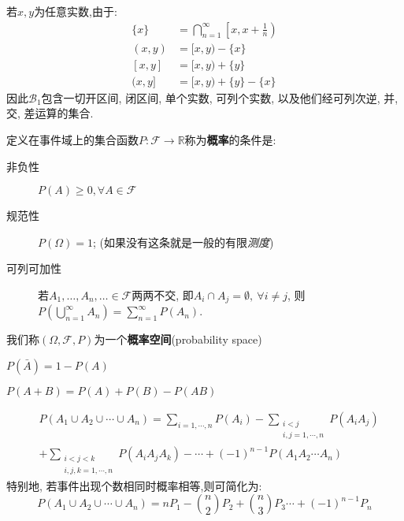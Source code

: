 若$x,y$为任意实数,由于:
\begin{align*}
    \{x\}  & =  \bigcap_{n=1}^{\infty}\left[x, x+\frac{1}{n}\right) \\
    (x, y) & =  [x, y)-\{x\}                                        \\
    [x, y] & =  [x, y)+\{y\}                                        \\
    (x, y] & =  [x, y)+\{y\}-\{x\}
\end{align*}
因此$\mathscr{B}_1$包含一切开区间, 闭区间, 单个实数, 可列个实数, 以及他们经可列次逆, 并, 交, 差运算的集合.

\begin{definition}
    定义在事件域上的集合函数$P : \mathscr{F} \to \mathbb{R}$称为\textbf{概率}的条件是:
    \begin{description}
        \item[非负性] $P(A)\ge 0 , \forall A \in \mathscr{F}$
        \item[规范性] $P(\Omega) = 1$; (如果没有这条就是一般的{\color{lightgray}有限}\emph{测度})
        \item[可列可加性] 若$A_{1},\dots,A_{n},\ldots \in \mathscr{F}$两两不交, 即$A_{i}\cap A_{j} = \emptyset, \ \forall i\neq j$, 则$P(\bigcup_{n=1}^{\infty}A_{n}) = \sum_{n=1}^{\infty}P(A_{n})$.
    \end{description}
    我们称$(\Omega,\mathscr{F},P)$为一个\textbf{概率空间}(probability space)
\end{definition}

\begin{corollary}
    $P(\bar{A})=1-P(A)$
\end{corollary}

\begin{corollary}
    $ P(A+B)=P(A)+P(B)-P(AB)$
\end{corollary}

\begin{corollary}
    \begin{align*}
         & P\left(A_{1} \cup A_{2} \cup \cdots \cup A_{n}\right)=\sum_{i=1, \cdots, n} P\left(A_{i}\right)-\sum_{\substack{i<j \\
        i, j=1, \cdots, n}} P\left(A_{i} A_{j}\right)                                                                          \\
         & +\sum_{\substack{i<j<k                                                                                              \\
                i, j, k=1, \cdots, n}} P\left(A_{i} A_{j} A_{k}\right)-\cdots+(-1)^{n-1} P\left(A_{1} A_{2} \cdots A_{n}\right)
    \end{align*}
    特别地, 若事件出现个数相同时概率相等,则可简化为:
    \[ P\left(A_{1} \cup A_{2} \cup \cdots \cup A_{n}\right)=n P_{1} - \binom{n}{2} P_{2} + \binom{n}{3} P_{3} \cdots+(-1)^{n-1} P_{n} \]
\end{corollary}



